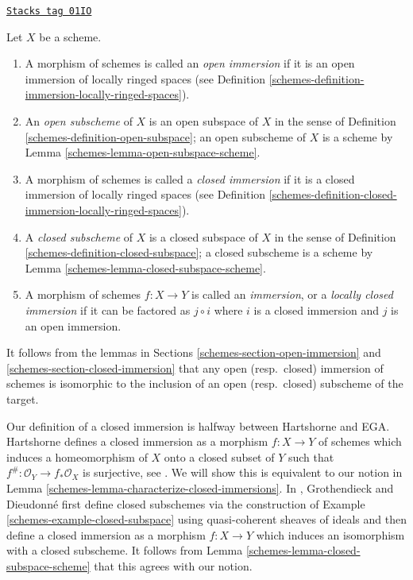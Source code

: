 \begin{definition}[Immersion]
\label{schemes-definition-immersion}
\href{https://stacks.math.columbia.edu/tag/01IO}{\texttt{Stacks tag 01IO}}

Let $X$ be a scheme.
\begin{enumerate}
\item A morphism of schemes is called an {\it open immersion}
if it is an open immersion of locally ringed spaces (see
Definition \ref{schemes-definition-immersion-locally-ringed-spaces}).
\item An {\it open subscheme} of $X$ is an open subspace of $X$
in the sense of Definition \ref{schemes-definition-open-subspace}; an open subscheme
of $X$ is a scheme by Lemma \ref{schemes-lemma-open-subspace-scheme}.
\item A morphism of schemes is called a {\it closed immersion}
if it is a closed immersion of locally ringed spaces (see
Definition \ref{schemes-definition-closed-immersion-locally-ringed-spaces}).
\item A {\it closed subscheme} of $X$ is a closed subspace of $X$
in the sense of Definition \ref{schemes-definition-closed-subspace}; a closed subscheme
is a scheme by Lemma \ref{schemes-lemma-closed-subspace-scheme}.
\item A morphism of schemes $f : X \to Y$ is called an {\it immersion},
or a {\it locally closed immersion} if it can be factored as
$j \circ i$ where $i$ is a closed immersion and $j$ is an open
immersion.
\end{enumerate}
\end{definition}

It follows from the lemmas in Sections \ref{schemes-section-open-immersion} and
\ref{schemes-section-closed-immersion} that any open (resp.\ closed) immersion of
schemes is isomorphic to the inclusion of an open (resp.\ closed) subscheme
of the target.

\medskip\noindent
Our definition of a closed immersion is halfway between Hartshorne
and EGA. Hartshorne defines a closed immersion as a morphism $f : X \to Y$ of
schemes which induces a homeomorphism of $X$ onto a closed subset of
$Y$ such that $f^\# : \mathcal{O}_Y \to f_*\mathcal{O}_X$ is surjective, see
\cite[Page 85]{H}. We will show this is equivalent to our notion in
Lemma \ref{schemes-lemma-characterize-closed-immersions}. In \cite{EGA},
Grothendieck and Dieudonn\'e first define closed subschemes
via the construction of Example \ref{schemes-example-closed-subspace}
using quasi-coherent sheaves of ideals and then define a closed immersion
as a morphism $f : X \to Y$ which induces an isomorphism with a
closed subscheme. It follows from Lemma \ref{schemes-lemma-closed-subspace-scheme}
that this agrees with our notion.

